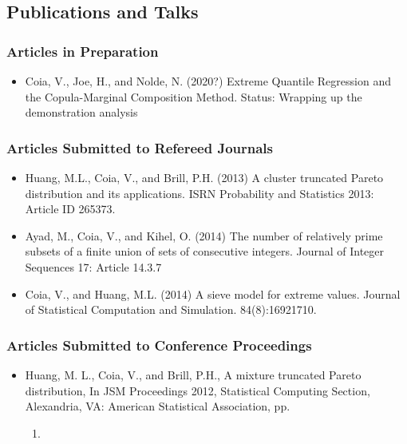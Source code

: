 \documentclass[]{article}
\providecommand{\tightlist}{%
  \setlength{\itemsep}{0pt}\setlength{\parskip}{0pt}}
\begin{document}
\hypertarget{publications-and-talks}{%
\subsection{Publications and Talks}\label{publications-and-talks}}

\hypertarget{articles-in-preparation}{%
\subsubsection{Articles in Preparation}\label{articles-in-preparation}}

\begin{itemize}
\tightlist
\item
  Coia, V., Joe, H., and Nolde, N. (2020?) Extreme Quantile Regression and the Copula-Marginal Composition Method.
  Status: Wrapping up the demonstration analysis
\end{itemize}

\hypertarget{articles-submitted-to-refereed-journals}{%
\subsubsection{Articles Submitted to Refereed Journals}\label{articles-submitted-to-refereed-journals}}

\begin{itemize}
\item
  Huang, M.L., Coia, V., and Brill, P.H. (2013) A cluster truncated
  Pareto distribution and its applications. ISRN Probability and
  Statistics 2013: Article ID 265373.
\item
  Ayad, M., Coia, V., and Kihel, O. (2014) The number of relatively
  prime subsets of a finite union of sets of consecutive integers.
  Journal of Integer Sequences 17: Article 14.3.7
\item
  Coia, V., and Huang, M.L. (2014) A sieve model for extreme
  values. Journal of Statistical Computation and Simulation.
  84(8):16921710.
\end{itemize}

\hypertarget{articles-submitted-to-conference-proceedings}{%
\subsubsection{Articles Submitted to Conference Proceedings}\label{articles-submitted-to-conference-proceedings}}

\begin{itemize}
\tightlist
\item
  Huang, M. L., Coia, V., and Brill, P.H., A mixture truncated
  Pareto distribution, In JSM Proceedings 2012, Statistical Computing
  Section, Alexandria, VA: American Statistical Association, pp.

  \begin{enumerate}
  \def\labelenumi{\arabic{enumi}.}
  \setcounter{enumi}{24882497}
  \item
  \end{enumerate}
\end{itemize}
\end{document}
